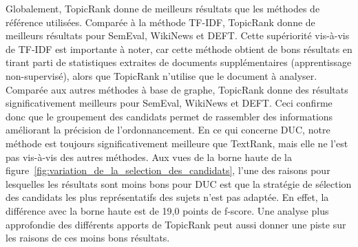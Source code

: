     Globalement, TopicRank donne de meilleurs résultats que les méthodes de
    référence utilisées.
    Comparée à la méthode TF-IDF, TopicRank donne de meilleurs résultats pour
    SemEval, WikiNews et DEFT. Cette supériorité vis-à-vis de TF-IDF est
    importante à noter, car cette méthode obtient de bons résultats en tirant
    parti de statistiques extraites de documents supplémentaires (apprentissage
    non-supervisé), alors que TopicRank n'utilise que le document à analyser.
    Comparée aux autres méthodes à base de graphe, TopicRank donne des
    résultats significativement meilleurs pour SemEval, WikiNews et DEFT. Ceci
    confirme donc que le groupement des candidats permet de rassembler des
    informations améliorant la précision de l'ordonnancement. En ce qui concerne
    DUC, notre méthode est toujours significativement meilleure que TextRank,
    mais elle ne l'est pas vis-à-vis des autres méthodes. Aux vues de la borne
    haute de la figure~\ref{fig:variation_de_la_selection_des_candidats}, l'une
    des raisons pour lesquelles les résultats sont moins bons pour DUC est que
    la stratégie de sélection des candidats les plus représentatifs des sujets
    n'est pas adaptée. En effet, la différence avec la borne haute est de 19,0
    points de f-score. Une analyse plus approfondie des différents apports de
    TopicRank peut aussi donner une piste sur les raisons de ces moins bons
    résultats.
